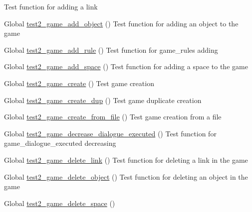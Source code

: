 \begin{DoxyRefList}
%
Test function for adding a link  
\item[Global \mbox{\hyperlink{game__test_8c_ab996895e69c5d41fab5515e88aed3975}{test2\+\_\+game\+\_\+add\+\_\+object}} ()]\label{test__test000188}%
%
Test function for adding an object to the game  
\item[Global \mbox{\hyperlink{game__test_8c_a07767ef71394c248cff054888ef2a5a0}{test2\+\_\+game\+\_\+add\+\_\+rule}} ()]\label{test__test000409}%
%
Test function for game\+\_\+rules adding  
\item[Global \mbox{\hyperlink{game__test_8c_aed0f40f3ab1c252e548b038542d7409d}{test2\+\_\+game\+\_\+add\+\_\+space}} ()]\label{test__test000213}%
%
Test function for adding a space to the game  
\item[Global \mbox{\hyperlink{game__test_8c_a04c9f940a26c3ec8249f5b1403c7a5c7}{test2\+\_\+game\+\_\+create}} ()]\label{test__test000138}%
%
Test game creation  
\item[Global \mbox{\hyperlink{game__test_8c_a6d88d54e1031a56aae5ad4f9f5ca032f}{test2\+\_\+game\+\_\+create\+\_\+dup}} ()]\label{test__test000140}%
%
Test game duplicate creation  
\item[Global \mbox{\hyperlink{game__test_8c_ad6ce67f6184f6ead2aaca860f64e9b76}{test2\+\_\+game\+\_\+create\+\_\+from\+\_\+file}} ()]\label{test__test000142}%
%
Test game creation from a file  
\item[Global \mbox{\hyperlink{game__test_8c_aeba3fb9ae4fa34426d9d28a980240979}{test2\+\_\+game\+\_\+decrease\+\_\+dialogue\+\_\+executed}} ()]\label{test__test000308}%
%
Test function for game\+\_\+dialogue\+\_\+executed decreasing  
\item[Global \mbox{\hyperlink{game__test_8c_a494db42466f5dcf11cf0b6ab0fc752cf}{test2\+\_\+game\+\_\+delete\+\_\+link}} ()]\label{test__test000228}%
%
Test function for deleting a link in the game  
\item[Global \mbox{\hyperlink{game__test_8c_a3cf300f73a6a331fdeecd1bfe41326d9}{test2\+\_\+game\+\_\+delete\+\_\+object}} ()]\label{test__test000191}%
%
Test function for deleting an object in the game  
\item[Global \mbox{\hyperlink{game__test_8c_ad7201af10b24bace2876833db984256e}{test2\+\_\+game\+\_\+delete\+\_\+space}} ()]\label{test__test000216}%

\end{DoxyRefList}
